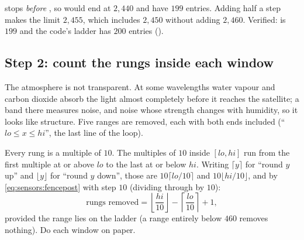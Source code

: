 \begin{sourcenote}
 stops \emph{before} , so
 would end at $2{,}440$ and have $199$ entries. Adding half a
step makes the limit $2{,}455$, which includes $2{,}450$ without adding $2{,}460$. Verified:
 is $199$ and the code's ladder has $200$ entries
().
\end{sourcenote}

\subsection{Step 2: count the rungs inside each window}

The atmosphere is not transparent. At some wavelengths water vapour and carbon dioxide absorb the
light almost completely before it reaches the satellite; a band there measures noise, and noise
whose strength changes with humidity, so it looks like structure. Five ranges are removed, each
with both ends included (``$lo \le x \le hi$'', the last line of the loop).

Every rung is a multiple of $10$. The multiples of $10$ inside $[lo, hi]$ run from the first
multiple at or above $lo$ to the last at or below $hi$. Writing $\lceil y \rceil$ for ``round $y$
up'' and $\lfloor y \rfloor$ for ``round $y$ down'', those are $10\lceil lo/10\rceil$ and
$10\lfloor hi/10\rfloor$, and by \cref{eq:sensors:fencepost} with step $10$ (dividing through by
$10$):
\begin{equation}\label{eq:sensors:count}
\text{rungs removed} = \left\lfloor \frac{hi}{10} \right\rfloor - \left\lceil \frac{lo}{10} \right\rceil + 1,
\end{equation}
provided the range lies on the ladder (a range entirely below $460$ removes nothing). Do each
window on paper.

